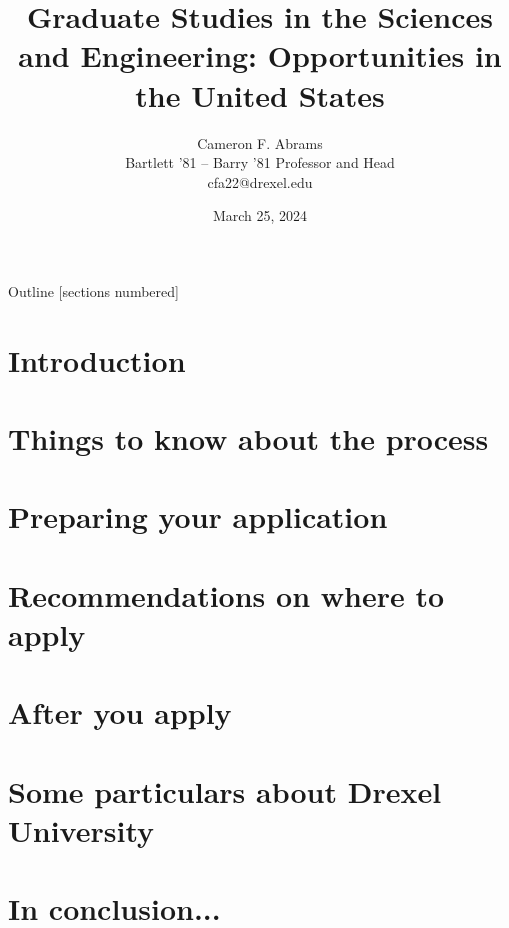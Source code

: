 \documentclass[10pt]{beamer}
\title{Graduate Studies in the Sciences and Engineering: Opportunities in the United States}
\date{March 25, 2024}
\author{Cameron F. Abrams\\Bartlett '81 -- Barry '81 Professor and Head\\cfa22@drexel.edu}
\institute{Drexel University, Department of Chemical and Biological Engineering}
\begin{document}
\maketitle

\begin{frame}{Outline}
  [sections numbered]
  \tableofcontents[hideallsubsections]
\end{frame}



\section{Introduction}



% 


\section{Things to know about the process}






% 

\section{Preparing your application}







\section{Recommendations on where to apply}






\section{After you apply}






\section{Some particulars about Drexel University}



\section{In conclusion...}

% 
\end{document}
